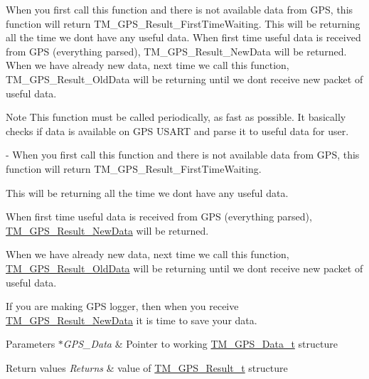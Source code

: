 When you first call this function and there is not available data from G\+P\+S, this function will return T\+M\+\_\+\+G\+P\+S\+\_\+\+Result\+\_\+\+First\+Time\+Waiting. This will be returning all the time we don\textquotesingle{}t have any useful data. When first time useful data is received from G\+P\+S (everything parsed), T\+M\+\_\+\+G\+P\+S\+\_\+\+Result\+\_\+\+New\+Data will be returned. When we have already new data, next time we call this function, T\+M\+\_\+\+G\+P\+S\+\_\+\+Result\+\_\+\+Old\+Data will be returning until we don\textquotesingle{}t receive new packet of useful data. \begin{DoxyNote}{Note}
This function must be called periodically, as fast as possible. It basically checks if data is available on G\+P\+S U\+S\+A\+R\+T and parse it to useful data for user. 

-\/ When you first call this function and there is not available data from G\+P\+S, this function will return T\+M\+\_\+\+G\+P\+S\+\_\+\+Result\+\_\+\+First\+Time\+Waiting.
\begin{DoxyItemize}
\item This will be returning all the time we don\textquotesingle{}t have any useful data.
\item When first time useful data is received from G\+P\+S (everything parsed), \hyperlink{group___t_m___g_p_s___typedefs_ggaf3a9184315a145cb8288691c9c529427a53532f11f7d268cfe75af5360985ff34}{T\+M\+\_\+\+G\+P\+S\+\_\+\+Result\+\_\+\+New\+Data} will be returned.
\item When we have already new data, next time we call this function, \hyperlink{group___t_m___g_p_s___typedefs_ggaf3a9184315a145cb8288691c9c529427a5098e6636e25483bc0580f8d947a0ff8}{T\+M\+\_\+\+G\+P\+S\+\_\+\+Result\+\_\+\+Old\+Data} will be returning until we don\textquotesingle{}t receive new packet of useful data. 
\end{DoxyItemize}

If you are making G\+P\+S logger, then when you receive \hyperlink{group___t_m___g_p_s___typedefs_ggaf3a9184315a145cb8288691c9c529427a53532f11f7d268cfe75af5360985ff34}{T\+M\+\_\+\+G\+P\+S\+\_\+\+Result\+\_\+\+New\+Data} it is time to save your data. 
\end{DoxyNote}

\begin{DoxyParams}{Parameters}
{\em $\ast$\+G\+P\+S\+\_\+\+Data} & Pointer to working \hyperlink{struct_t_m___g_p_s___data__t}{T\+M\+\_\+\+G\+P\+S\+\_\+\+Data\+\_\+t} structure \\
\hline
\end{DoxyParams}

\begin{DoxyRetVals}{Return values}
{\em Returns} & value of \hyperlink{group___t_m___g_p_s___typedefs_gaf3a9184315a145cb8288691c9c529427}{T\+M\+\_\+\+G\+P\+S\+\_\+\+Result\+\_\+t} structure \\
\hline
\end{DoxyRetVals}
